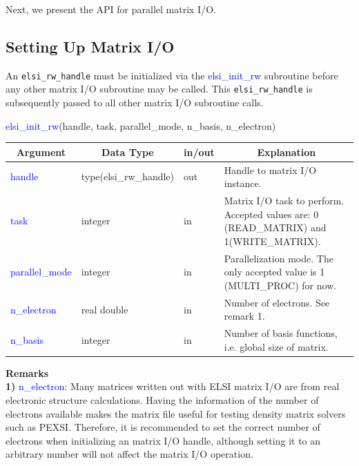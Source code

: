 \documentclass{report}
\begin{document}
Next, we present the API for parallel matrix I/O.\\

\subsection{Setting Up Matrix I/O}
\label{subsec:rw_init}
An \texttt{elsi\_rw\_handle} must be initialized via the \textcolor{blue}{elsi\_init\_rw} subroutine before any other matrix I/O subroutine may be called.  This \texttt{elsi\_rw\_handle} is subsequently passed to all other matrix I/O subroutine calls.\\

\newpage
\begin{labeling}{\hspace{6cm}}
\item [\hspace{0.3cm} \textcolor{blue}{elsi\_init\_rw}(handle, task, parallel\_mode, n\_basis, n\_electron)]
\end{labeling}

\begin{tabular}[]{|p{20mm}|p{45mm}|p{15mm}|p{85mm}|}
\hline
\multicolumn{1}{|c|}{\textbf{Argument}} & \multicolumn{1}{c|}{\textbf{Data Type}} & \multicolumn{1}{c|}{\textbf{in/out}} & \multicolumn{1}{c|}{\textbf{Explanation}}\\
\hline
\textcolor{blue}{handle}         & type(elsi\_rw\_handle) & out & Handle to matrix I/O instance.\\
\hline
\textcolor{blue}{task}           & integer                & in  & Matrix I/O task to perform.  Accepted values are:  0 (READ\_MATRIX) and 1(WRITE\_MATRIX).\\
\hline
\textcolor{blue}{parallel\_mode} & integer                & in  & Parallelization mode.  The only accepted value is 1 (MULTI\_PROC) for now.\\
\hline
\textcolor{blue}{n\_electron}    & real double            & in  & Number of electrons.  See remark 1.\\
\hline
\textcolor{blue}{n\_basis}       & integer                & in  & Number of basis functions, i.e. global size of matrix.\\
\hline
\end{tabular}

\bigskip
\textbf{Remarks}\\

\textbf{1)} \textcolor{blue}{n\_electron}:  Many matrices written out with ELSI matrix I/O are from real electronic structure calculations.  Having the information of the number of electrons available makes the matrix file useful for testing density matrix solvers such as PEXSI.  Therefore, it is recommended to set the correct number of electrons when initializing an matrix I/O handle, although setting it to an arbitrary number will not affect the matrix I/O operation.\\
\end{document}
